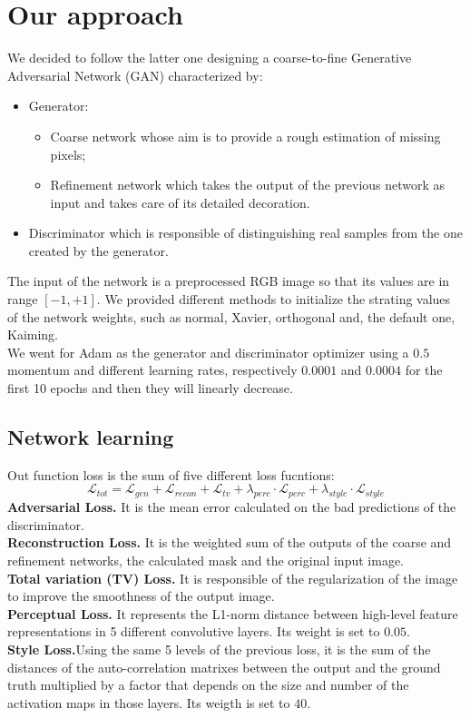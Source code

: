 \documentclass[10pt,twocolumn,letterpaper]{article}
\begin{document}
	\section{Our approach}
  We decided to follow the latter one designing a coarse-to-fine Generative
  Adversarial Network (GAN) characterized by:
	\begin{itemize}
		\item
		Generator:
		\begin{itemize}
			\item
      Coarse network whose aim is to provide a rough estimation of missing
        pixels;
			\item
      Refinement network which takes the output of the previous network as input
        and takes care of its detailed decoration.
		\end{itemize}
		\item
    Discriminator which is responsible of distinguishing real samples from the
      one created by the generator.
	\end{itemize}
  The input of the network is a preprocessed RGB image so that its values are in
  range \([-1,+1]\).
  We provided different methods to initialize the strating values of the network
  weights, such as normal, Xavier, orthogonal and, the default one, Kaiming.
	\\
  We went for Adam as the generator and discriminator optimizer using a \(0.5\)
  momentum and different learning rates, respectively \(0.0001\) and \(0.0004\)
  for the first 10 epochs and then they will linearly decrease.
	\subsection{Network learning}
  Out function loss is the sum of five different loss fucntions:
	\begin{equation}
    \mathcal{L}_{tot} = \mathcal{L}_{gen} + \mathcal{L}_{recon} +
    \mathcal{L}_{tv} + \lambda_{perc} \cdot \mathcal{L}_{perc} + \lambda_{style}
    \cdot \mathcal{L}_{style}
	\end{equation}
  \textbf{Adversarial Loss.} It is the mean error calculated on the bad
  predictions of the discriminator. \\
  \textbf{Reconstruction Loss.} It is the weighted sum of the outputs of the
  coarse and refinement networks, the calculated mask and the original input
  image. \\
  \textbf{Total variation (TV) Loss.} It is responsible of the regularization of
  the image to improve the smoothness of the output image. \\
	\textbf{Perceptual Loss.} It represents the L1-norm distance between high-level feature representations in 5 different convolutive layers. Its weight is set to \(0.05\). \\
  \textbf{Style Loss.}Using the same 5 levels of the previous loss, it is the
  sum of the distances of the auto-correlation matrixes between the output and
  the ground truth multiplied by a factor that depends on the size and number of
  the activation maps in those layers. Its weigth is set to \(40\). \\
\end{document}
